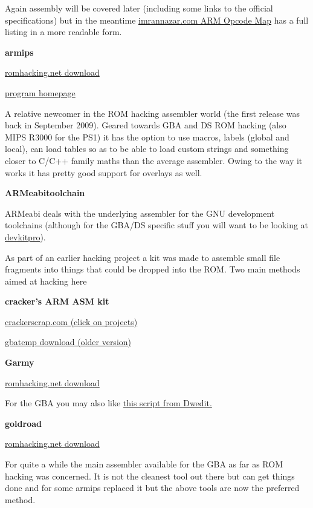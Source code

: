 \documentclass[
]{book}
\begin{document}
Again assembly will be covered later (including some links to the official specifications) but in the meantime \href{http://imrannazar.com/ARM-Opcode-Map}{imrannazar.com ARM Opcode Map} has a full listing in a more readable form.

\textbf{armips}

\href{http://www.romhacking.net/utilities/635/}{romhacking.net download}

\href{http://aerie.wingdreams.net/?page_id=6}{program homepage}

A relative newcomer in the ROM hacking assembler world (the first release was back in September 2009). Geared towards GBA and DS ROM hacking (also MIPS R3000 for the PS1) it has the option to use macros, labels (global and local), can load tables so as to be able to load custom strings and something closer to C/C++ family maths than the average assembler. Owing to the way it works it has pretty good support for overlays as well.

\textbf{ARMeabitoolchain}

ARMeabi deals with the underlying assembler for the GNU development toolchains (although for the GBA/DS specific stuff you will want to be looking at \href{http://devkitpro.org/}{devkitpro}).

As part of an earlier hacking project a kit was made to assemble small file fragments into things that could be dropped into the ROM. Two main methods aimed at hacking here

\textbf{cracker's ARM ASM kit}

\href{http://crackerscrap.com/}{crackerscrap.com (click on projects)}

\href{http://gbatemp.net/up/cr-dstmt.zip}{gbatemp download (older version)}

\textbf{Garmy}

\href{http://www.romhacking.net/utilities/456/}{romhacking.net download}

For the GBA you may also like \href{http://forums.nesdev.com/viewtopic.php?f=5\&t=10176\&start=0\#p113532}{this script from Dwedit.}

\textbf{goldroad}

\href{http://www.romhacking.net/utilities/343/}{romhacking.net download}

For quite a while the main assembler available for the GBA as far as ROM hacking was concerned. It is not the cleanest tool out there but can get things done and for some armips replaced it but the above tools are now the preferred method.
\end{document}
